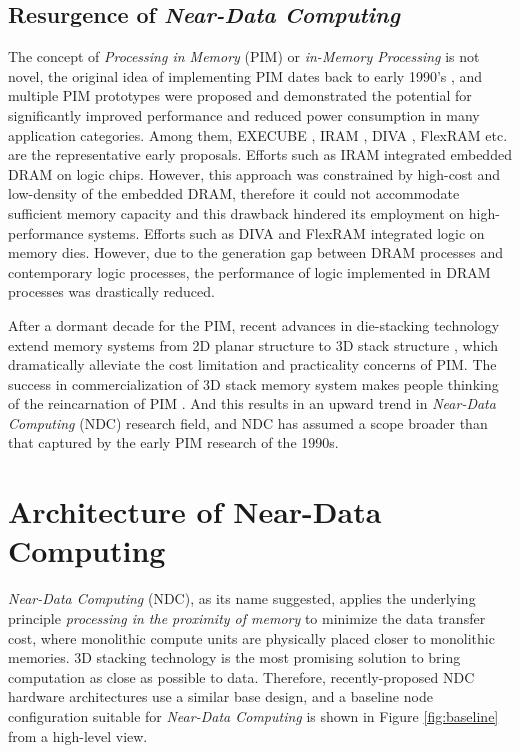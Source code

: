 \documentclass[letterpaper, 11pt, conference, margin=1in]{ieeeconf}   %
\begin{document}
\subsection{\bf Resurgence of \textit{Near-Data Computing}}
The concept of \textit{Processing in Memory} (PIM) or \textit{in-Memory Processing} is not novel, the original idea of implementing PIM dates back to early 1990's \cite{Kogge:1994:ENA:1260980.1261010, Gokhale:1995:PMT:618996.620191, Hall:1999:MIA:331532.331589, Patterson:1997:CIR:623274.624083, 808425, 748803}, and multiple PIM prototypes were proposed and demonstrated the potential for significantly improved performance and reduced power consumption in many application categories. Among them, EXECUBE \cite{Kogge:1994:ENA:1260980.1261010}, IRAM \cite{Patterson:1997:CIR:623274.624083}, DIVA \cite{Hall:1999:MIA:331532.331589}, FlexRAM \cite{808425} etc. are the representative early proposals. Efforts such as IRAM \cite{Patterson:1997:CIR:623274.624083} integrated embedded DRAM on logic chips. However, this approach was constrained by high-cost and low-density of the embedded DRAM, therefore it could not accommodate sufficient memory capacity and this drawback hindered its employment on high-performance systems.  Efforts such as DIVA \cite{Hall:1999:MIA:331532.331589} and FlexRAM \cite{808425} integrated logic on memory dies. However, due to the generation gap between DRAM processes and contemporary logic processes, the performance of logic implemented in DRAM processes was drastically reduced.

After a dormant decade for the PIM, recent advances in die-stacking technology extend memory systems from 2D planar structure to 3D stack structure \cite{Papanikolaou:2010:TDS:1965079, 6176900, 6131504}, which dramatically alleviate the cost limitation and practicality concerns of PIM. The success in commercialization of 3D stack memory system makes people thinking of the reincarnation of PIM \cite{Micron, AMD}. And this results in an upward trend in \textit{Near-Data Computing} (NDC) research field, and NDC has assumed a scope broader than that captured by the early PIM research of the 1990s.


\section{Architecture of Near-Data Computing}
\textit{Near-Data Computing} (NDC), as its name suggested, applies the underlying principle \textit{processing in the proximity of memory} to minimize the data transfer cost, where monolithic compute units are physically placed closer to monolithic memories. 3D stacking technology is the most promising solution to bring computation as close as possible to data. Therefore, recently-proposed NDC hardware architectures use a similar base design, and a baseline node configuration suitable for \textit{Near-Data Computing} is shown in Figure \ref{fig:baseline} from a high-level view.
\end{document}
